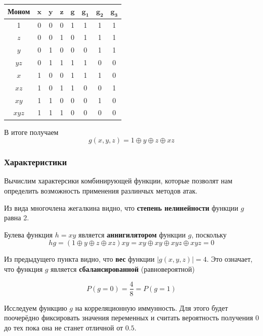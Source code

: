 \documentclass[a4paper,12pt]{article}
\theoremstyle{definition}
\begin{document}
	\begin{table}[h!]
		\begin{center}
			\begin{tabular}{|c|c|c|c||c||c|c|c|}
				\hline
				\textbf{Моном} & $ \pmb{x} $ & $ \pmb{y} $ & $ \pmb{z} $ & $ \pmb{g} $ & $ \pmb{g_1} $ & $ \pmb{g_2} $ & $ \pmb{g_3} $ \\ \hline
				1 & 0 & 0 & 0 & 1 & 1 & 1 & 1 \\ \hline
			  $z$ & 0 & 0 & 1 & 0 & 1 & 1 & 1 \\ \hline
			  $y$ & 0 & 1 & 0 & 0 & 0 & 1 & 1 \\ \hline
			$y z$ & 0 & 1 & 1 & 1 & 1 & 0 & 0 \\ \hline
			  $x$ & 1 & 0 & 0 & 1 & 1 & 1 & 0 \\ \hline
			$x z$ & 1 & 0 & 1 & 1 & 0 & 0 & 1 \\ \hline
			$x y$ & 1 & 1 & 0 & 0 & 0 & 1 & 0 \\ \hline
		  $x y z$ & 1 & 1 & 1 & 0 & 0 & 0 & 0 \\ \hline
			\end{tabular}
		\end{center}
	\end{table}
		
	В итоге получаем 	
	\[ g(x,y,z) = 1 \oplus y \oplus z \oplus x z\]
	
	

	\subsubsection{Характеристики} \label{Характеристики}
	
	Вычислим характерсики комбинирующей функции, которые позволят нам определить возможность применения разлинчых методов атак.
	
	Из вида многочлена жегалкина видно, что \textbf{степень нелинейности} функции $g$ равна 2. 
	
	Булева функция $h = x y$ является \textbf{аннигилятором} функции $g$, поскольку
	\[ h g = \left(1 \oplus y \oplus z \oplus x z \right) xy = xy \oplus xy \oplus xyz \oplus xyz = 0 \]

	Из предыдущего пункта видно, что \textbf{вес} функции $|g(x,y,z)| = 4$. Это означает, что функция $g$ является \textbf{сбалансированной} (равновероятной)
	
	\[ P(g = 0) = \frac{4}{8} = P(g = 1) \]

	Исследуем функцию $g$ на корреляционную иммунность. Для этого будет поочерёдно фиксировать значения переменных и считать вероятность получения $0$ до тех пока она не станет отличной от $0.5$.
	
\end{document}
